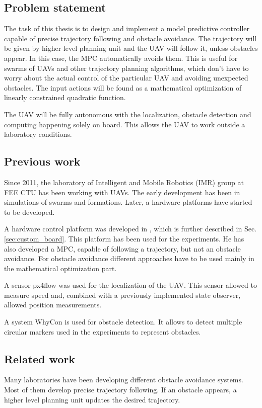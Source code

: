 \documentclass[a4paper,11pt,titlepage]{article}
\begin{document}
\subsection{Problem statement}
The task of this thesis is to design and implement a model predictive controller capable of precise trajectory following and obstacle avoidance. The trajectory will be given by higher level planning unit and the UAV will follow it, unless obstacles appear. In this case, the MPC automatically avoids them. This is useful for swarms of UAVs and other trajectory planning algorithms, which don't have to worry about the actual control of the particular UAV and avoiding unexpected obstacles. The input actions will be found as a mathematical optimization of linearly constrained quadratic function. 

The UAV will be fully autonomous with the localization, obstacle detection and computing happening solely on board. This allows the UAV to work outside a laboratory conditions. 

\subsection{Previous work}
Since 2011, the laboratory of Intelligent and Mobile Robotics (IMR) group at FEE CTU has been working with UAVs. The early development has been in simulations of swarms and formations. Later, a hardware platforms have started to be developed. 

A hardware control platform was developed in \cite{tomas}, which is further described in Sec. \ref{sec:custom_board}. This platform has been used for the experiments. He has also developed a MPC, capable of following a trajectory, but not an obstacle avoidance. For obstacle avoidance different approaches have to be used mainly in the mathematical optimization part.

A sensor px4flow \cite{endrych2014} was used for the localization of the UAV. This sensor allowed to measure speed and, combined with a previously implemented state observer\cite{tomas}, allowed position measurements. 

A system WhyCon\cite{whycon_icar}\cite{whycon_jint} is used for obstacle detection. It allows to detect multiple circular markers used in the experiments to represent obstacles.

\subsection{Related work}
Many laboratories have been developing different obstacle avoidance systems. Most of them develop precise trajectory following. If an obstacle appears, a higher level planning unit updates the desired trajectory.
\end{document}

